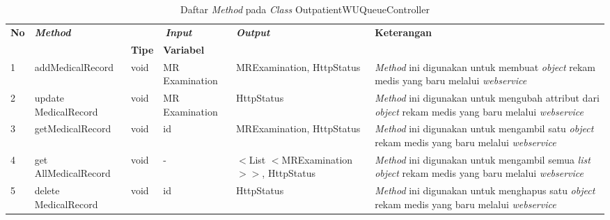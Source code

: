 \begin{table}[H]
	\caption{Daftar \textit{Method} pada \textit{Class} OutpatientWUQueueController}
	\centering
	\small
	\begin{adjustbox}{width=1\textwidth}	
		\begin{tabular}{|p{0.4cm}|p{2.8cm}|p{0.9cm}|p{1.8cm}|p{2.8cm}|p{2.5cm}|}
			\hline
			\multirow{2}{*}{\textbf{No}} & \multirow{2}{*}{\textit{\textbf{Method}}} & \multicolumn{2}{c|}{\textit{\textbf{Input}}} & \multirow{2}{*}{\textit{\textbf{Output}}} & 
			\multirow{2}{*}{\textbf{Keterangan}}\\
			\cline{3-4}
			& & \textbf{Tipe} & \textbf{Variabel} & & \\
			\hline
			1 & addMedicalRecord & void & MR
			Examination & MRExamination, HttpStatus & \textit{Method} ini digunakan untuk membuat \textit{object} rekam medis yang baru melalui \textit{webservice}\\
			\hline
			2 & update
			MedicalRecord & void & MR
			Examination & HttpStatus & \textit{Method} ini digunakan untuk mengubah attribut dari \textit{object} rekam medis yang baru melalui \textit{webservice}\\
			\hline
			3 & getMedicalRecord & void & id & MRExamination, HttpStatus & \textit{Method} ini digunakan untuk mengambil satu \textit{object} rekam medis yang baru melalui \textit{webservice}\\
			\hline
			4 & get
			AllMedicalRecord & void & - & $<$List
			$<$MRExamination
			$>$$>$, HttpStatus & \textit{Method} ini digunakan untuk mengambil semua \textit{list} \textit{object} rekam medis yang baru melalui \textit{webservice}\\
			\hline
			5 & delete
			MedicalRecord & void & id & HttpStatus & \textit{Method} ini digunakan untuk menghapus satu \textit{object} rekam medis yang baru melalui \textit{webservice}\\
			\hline
		\end{tabular}
	\end{adjustbox}
\end{table}
